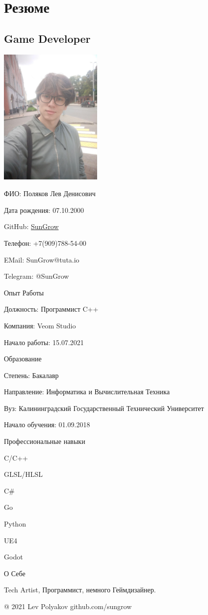 \hypertarget{ux440ux435ux437ux44eux43cux435}{%
\section{Резюме}\label{ux440ux435ux437ux44eux43cux435}}

\hypertarget{game-developer}{%
\subsection{Game Developer}\label{game-developer}}

\includegraphics[width=1.97917in,height=2.65625in]{img/cvimg.jpg}

ФИО: Поляков Лев Денисович

Дата рождения: 07.10.2000

GitHub: \href{https://github.com/SunGrow}{SunGrow}

Телефон: +7(909)788-54-00

EMail: SunGrow@tuta.io

Telegram: @SunGrow

Опыт Работы

Должность: Программист C++

Компания: Veom Studio

Начало работы: 15.07.2021

Образование

Степень: Бакалавр

Направление: Информатика и Вычислительная Техника

Вуз: Калининградский Государственный Технический Университет

Начало обучения: 01.09.2018

Профессиональные навыки

C/C++

GLSL/HLSL

C\#

Go

Python

UE4

Godot

О Себе

Tech Artist, Программист, немного Геймдизайнер.

@ 2021 Lev Polyakov github.com/sungrow
